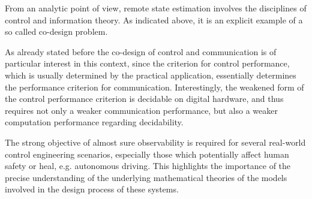 \documentclass[conference]{IEEEtran}
\begin{document}
	{\color{violet} From an analytic point of view, remote state estimation involves the disciplines of control and information theory. As indicated above, it is an explicit example of a so 
	called co-design problem.} 
	
	{\color{violet} As already stated before the co-design of control and communication is of particular interest in this context, since the criterion for control performance, which is
	usually determined by the practical application, essentially determines the performance criterion for communication. Interestingly, the weakened form of the control performance criterion 
	is decidable on digital hardware, and thus requires not only a weaker communication performance, but also a weaker computation performance regarding decidability.} 
	
	
	{\color{yellow} The strong objective of almost sure observability is required for several real-world control engineering scenarios, especially those which potentially affect human safety or heal, e.g.
	autonomous driving. This highlights the importance of the precise understanding of the underlying mathematical theories of the models involved in the design process of these systems.}
	
	
	
	
		



\end{document}
